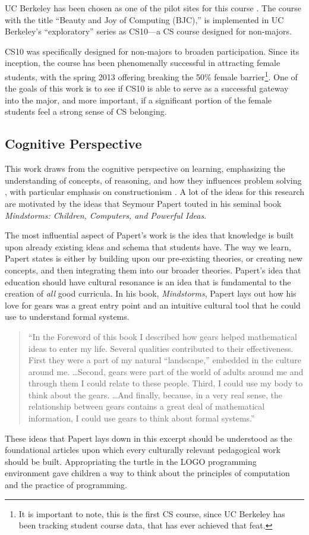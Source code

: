 \documentclass[twoside,openright,titlepage,numbers=noenddot,headinclude,%
               footinclude=true,cleardoublepage=empty,abstractoff,BCOR=5mm,%
               paper=a4,fontsize=11pt,ngerman,american]{scrreprt}
\numberwithin{theorem}{chapter}
\numberwithin{definition}{chapter}
\numberwithin{algorithm}{chapter}
\numberwithin{figure}{chapter}
\numberwithin{table}{chapter}
\numberwithin{equation}{chapter}
\begin{document}
UC Berkeley has been chosen as one of the pilot sites for this course \cite{Astrachan:2011:CPP:1953163.1953281}. The course with the title ``Beauty and Joy of Computing (BJC),'' is implemented in UC Berkeley's ``exploratory'' series as CS10---a CS course designed for non-majors. 

CS10 was specifically designed for non-majors to broaden participation. Since its inception, the course has been phenomenally successful in attracting female students, with the spring 2013 offering breaking the 50\% female barrier\footnote{ It is important to note, this is the first CS course, since UC Berkeley has been tracking student course data, that has ever achieved that feat.}. One of the goals of this work is to see if CS10 is able to serve as a successful gateway into the major, and more important, if a significant portion of the female students feel a strong sense of CS belonging.

\subsection *{Cognitive Perspective}

This work draws from the cognitive perspective on learning, emphasizing the understanding of concepts, of reasoning, and how they influences problem solving \cite{Greeno1996}, with particular emphasis on constructionism \cite{Papert1980}. A lot of the ideas for this research are motivated by the ideas that Seymour Papert touted in his seminal book \textit{Mindstorms: Children, Computers, and Powerful Ideas}. 

The most influential aspect of Papert's work is the idea that knowledge is built upon already existing ideas and schema that students have. The way we learn, Papert states is either by building upon our pre-existing theories, or creating new concepts, and then integrating them into our broader theories. Papert's idea that education should have cultural resonance is an idea that is fundamental to the creation of \textit{all} good curricula. In his book, \textit{Mindstorms}, Papert lays out how his love for gears was a great entry point and an intuitive cultural tool that he could use to understand formal systems. 
\begin{quote}
``In the Foreword of this book I described how gears helped mathematical ideas to enter my life. Several qualities contributed to their effectiveness. First they were a part of my natural ``landscape,'' embedded in the culture around me. \ldots Second, gears were part of the world of adults around me and through them I could relate to these people. Third, I could use my body to think about the gears. \ldots And finally, because, in a very real sense, the relationship between gears contains a great deal of mathematical information, I could use gears to think about formal systems.'' \cite[pp. 11]{Papert1980} 
\end{quote} 
These ideas that Papert lays down in this excerpt should be understood as the foundational articles upon which every culturally relevant pedagogical work should be built. Appropriating the turtle in the LOGO programming environment gave children a way to think about the principles of computation and the practice of programming. 
\end{document}
